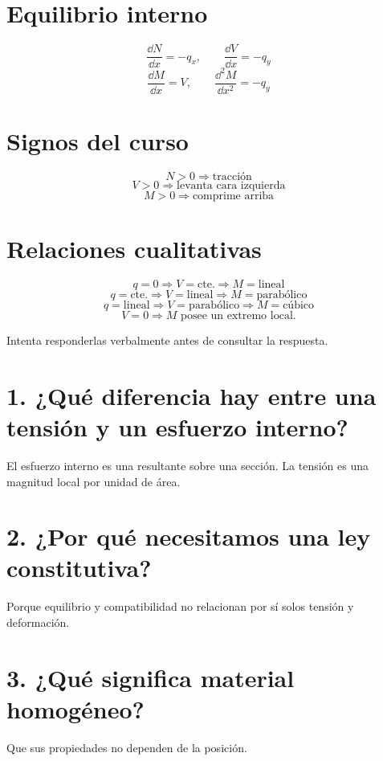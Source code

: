 \section*{Equilibrio interno}
\[
\boxed{\frac{\dd N}{\dd x}=-q_x},\qquad
\boxed{\frac{\dd V}{\dd x}=-q_y}
\]
\[
\boxed{\frac{\dd M}{\dd x}=V},\qquad
\boxed{\frac{\dd^2M}{\dd x^2}=-q_y}
\]

\section*{Signos del curso}
\[
\boxed{N>0\Rightarrow\text{tracción}}
\]
\[
\boxed{V>0\Rightarrow\text{levanta cara izquierda}}
\]
\[
\boxed{M>0\Rightarrow\text{comprime arriba}}
\]

\section*{Relaciones cualitativas}
\[
q=0\Rightarrow V=\text{cte.}\Rightarrow M=\text{lineal}
\]
\[
q=\text{cte.}\Rightarrow V=\text{lineal}\Rightarrow M=\text{parabólico}
\]
\[
q=\text{lineal}\Rightarrow V=\text{parabólico}\Rightarrow M=\text{cúbico}
\]
\[
V=0\Rightarrow M\text{ posee un extremo local}.
\]


Intenta responderlas verbalmente antes de consultar la respuesta.

\section*{1. ¿Qué diferencia hay entre una tensión y un esfuerzo interno?}
El esfuerzo interno es una resultante sobre una sección. La tensión es una magnitud local por unidad de área.

\section*{2. ¿Por qué necesitamos una ley constitutiva?}
Porque equilibrio y compatibilidad no relacionan por sí solos tensión y deformación.

\section*{3. ¿Qué significa material homogéneo?}
Que sus propiedades no dependen de la posición.

